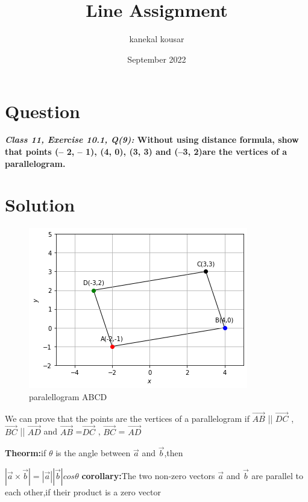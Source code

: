 \documentclass[journal,12pt,twocolumn]{IEEEtran}
\title{\textbf{\\Line Assignment}}
\author{kanekal kousar}
\date{September 2022}
\begin{document}
\maketitle


\section{Question}
\textbf{\textit{Class 11, Exercise 10.1, Q(9):} Without using distance formula, show that points (– 2, – 1), (4, 0), (3, 3) and (–3, 2)are the vertices of a parallelogram.}

\section{Solution}
\raggedright 

\begin{figure}[h!]
\centering
\includegraphics[scale=0.5]{fig/paralellogram.png} 
\caption{paralellogram ABCD}
\end{figure}

\vspace{0.25cm}
We can prove that the points are the vertices of a parallelogram if  \textbf{$\vec{AB}$} || \textbf{$\vec{DC}$} , \textbf{$\vec{BC}$} || \textbf{$\vec{AD}$} and  \textbf{$\vec{AB}$} =\textbf{$\vec{DC}$} , \textbf{$\vec{BC}$} = \textbf{$\vec{AD}$}
\vspace{0.3cm}

\textbf{Theorm:}if $\theta$ is the angle between $\vec{a}$ and $\vec{b}$,then

\hspace{3cm}
\boldmath
	$|\vec{a}\times \vec{b}|=|\vec{a}|| \vec{b}|cos\theta$
\unboldmath
\vspace{0.25cm}
\textbf{corollary:}The two non-zero vectors $\vec{a}$ and $\vec{b}$ are parallel to each other,if their product is a zero vector
\end{document}
